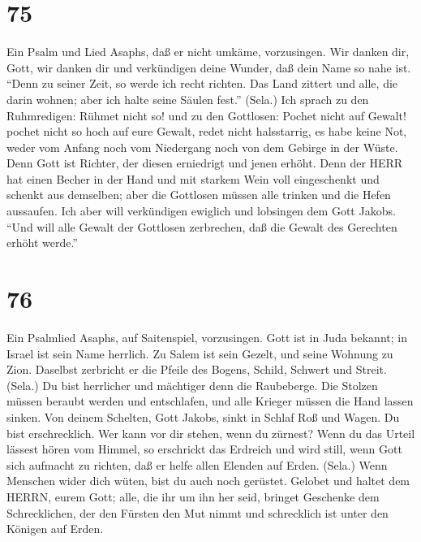 \hypertarget{section-74}{%
\section{75}\label{section-74}}

 Ein Psalm und Lied Asaphs, daß er nicht umkäme,
vorzusingen. Wir danken dir, Gott, wir danken dir und verkündigen deine
Wunder, daß dein Name so nahe ist.  ``Denn zu seiner Zeit,
so werde ich recht richten.  Das Land zittert und alle, die
darin wohnen; aber ich halte seine Säulen fest.'' (Sela.) 
Ich sprach zu den Ruhmredigen: Rühmet nicht so! und zu den Gottlosen:
Pochet nicht auf Gewalt!  pochet nicht so hoch auf eure
Gewalt, redet nicht halsstarrig,  es habe keine Not, weder
vom Anfang noch vom Niedergang noch von dem Gebirge in der Wüste.
 Denn Gott ist Richter, der diesen erniedrigt und jenen
erhöht.  Denn der HERR hat einen Becher in der Hand und mit
starkem Wein voll eingeschenkt und schenkt aus demselben; aber die
Gottlosen müssen alle trinken und die Hefen aussaufen.  Ich
aber will verkündigen ewiglich und lobsingen dem Gott Jakobs.
 ``Und will alle Gewalt der Gottlosen zerbrechen, daß die
Gewalt des Gerechten erhöht werde.''

\hypertarget{section-75}{%
\section{76}\label{section-75}}

 Ein Psalmlied Asaphs, auf Saitenspiel, vorzusingen. Gott
ist in Juda bekannt; in Israel ist sein Name herrlich.  Zu
Salem ist sein Gezelt, und seine Wohnung zu Zion.  Daselbst
zerbricht er die Pfeile des Bogens, Schild, Schwert und Streit. (Sela.)
 Du bist herrlicher und mächtiger denn die Raubeberge.
 Die Stolzen müssen beraubt werden und entschlafen, und alle
Krieger müssen die Hand lassen sinken.  Von deinem Schelten,
Gott Jakobs, sinkt in Schlaf Roß und Wagen.  Du bist
erschrecklich. Wer kann vor dir stehen, wenn du zürnest? 
Wenn du das Urteil lässest hören vom Himmel, so erschrickt das Erdreich
und wird still,  wenn Gott sich aufmacht zu richten, daß er
helfe allen Elenden auf Erden. (Sela.)  Wenn Menschen wider
dich wüten, bist du auch noch gerüstet.  Gelobet und haltet
dem HERRN, eurem Gott; alle, die ihr um ihn her seid, bringet Geschenke
dem Schrecklichen,  der den Fürsten den Mut nimmt und
schrecklich ist unter den Königen auf Erden.

